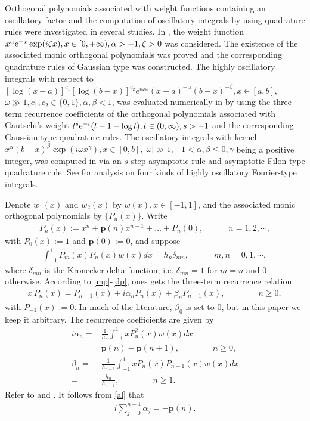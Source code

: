 \documentclass[11pt,a4paper]{article}
\numberwithin{equation}{section}
\begin{document}
Orthogonal polynomials associated with weight functions containing an oscillatory factor and the computation of oscillatory integrals by using quadrature rules were investigated in several studies. In \cite{MSM}, the weight function $x^{\alpha}{\rm e}^{-x}\exp(i\zeta x), x\in[0,+\infty),\alpha>-1,\zeta>0$ was considered. The existence of the associated monic orthogonal polynomials was proved and the corresponding quadrature rules of Gaussian type was constructed. The highly oscillatory integrals with respect to $[\log(x-a)]^{c_1}[\log(b-x)]^{c_2}e^{i\omega x}(x-a)^{-\alpha}(b-x)^{-\beta}, x\in[a,b]$, $\omega\gg1, c_1,c_2\in\{0,1\}, \alpha,\beta<1$, was evaluated numerically in \cite{KHM} by using the three-term recurrence coefficients of the orthogonal polynomials associated with Gautschi's weight $t^{s}{\rm e}^{-t}(t-1-\log t), t\in(0,\infty),s>-1$ and the corresponding Gaussian-type quadrature rules. The oscillatory integrals with kernel $x^{\alpha}(b-x)^{\beta}\exp(i\omega x^{\gamma}), x\in[0,b], |\omega|\gg1, -1<\alpha,\beta\leq0, \gamma$ being a positive integer, was computed in \cite{CYC} via an $s$-step asymptotic rule and asymptotic-Filon-type quadrature rule. See \cite{KX} for analysis on four kinds of highly oscillatory Fourier-type integrals.

Denote $w_1(x)$ and $w_2(x)$ by $w(x), x\in[-1,1]$, and the associated monic orthogonal polynomials by $\{P_n(x)\}$. Write
\begin{align}\label{mp}
P_n(x):=x^n+\textbf{p}(n)x^{n-1}+\dots+P_n(0),\quad\qquad n=1,2,\cdots,
\end{align}
with $P_0(x):=1$ and $\textbf{p}(0):=0$, and suppose
\begin{align}\label{dp}	
\int_{-1}^1P_m(x)P_n(x)w(x)dx=h_n\delta_{mn},\quad\qquad m,n=0,1,\cdots,
\end{align}
where $\delta_{mn}$ is the Kronecker delta function, i.e. $\delta_{mn}=1$ for $m=n$ and $0$ otherwise. According to \eqref{mp}-\eqref{dp}, ones gets the three-term recurrence relation
\begin{align}\label{3r}
x\,P_n(x)=P_{n+1}(x)+i\alpha_nP_n(x)+\beta_nP_{n-1}(x),\qquad\qquad n\geq0,
\end{align}
with $P_{-1}(x):=0$. In much of the literature, $\beta_0$ is set to 0, but in this paper we keep it arbitrary. The recurrence coefficients  are given by
\begin{align}
i\alpha_n=&\frac{1}{h_n}\int_{-1}^1xP_n^2(x)w(x)dx\label{al-1}\\
=&\textbf{p}(n)-\textbf{p}(n+1),\qquad\qquad n\geq0,\label{al}\\
\beta_n=&\frac{1}{h_{n-1}}\int_{-1}^1xP_n(x)P_{n-1}(x)w(x)dx\label{bt-1}\\
=&\frac{h_n}{h_{n-1}},\qquad\qquad n\geq1.\label{bt}
\end{align}
Refer to \cite[p. 22]{Ismail} and \cite{ML25}. It follows from \eqref{al} that
\begin{align}
\mathit{i}\sum\limits_{j=0}^{n-1} \alpha_{j}=-\textbf{p}(n).\label{(1.7)}
\end{align}
\end{document}
